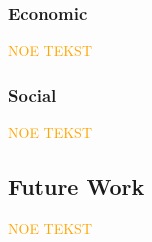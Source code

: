 \subsubsection*{Economic}

\textcolor{orange}{NOE TEKST}

\subsubsection*{Social}

\textcolor{orange}{NOE TEKST}

\subsection{Future Work}
\begin{comment}
    - User Guide
    - Offline Mode (download a map with data)
    - Mobile
    - Export Data
    - Machine Learning
    - Notification System
    - Better Accessibility (e.g. color-blind modes)
    - Hour picker (for mer detaljert data for spesifikke tidspunk, f.eks. om en sjåfør skal kjøre om natten)
    - More Optimization?
        - WebGL for rendering of vectors (downside?: does require newer hardware/browsers)
\end{comment}

\textcolor{orange}{NOE TEKST}
